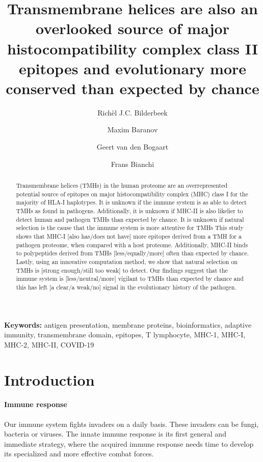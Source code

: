 \documentclass{article}
\title{
  Transmembrane helices are also 
  an overlooked source of major histocompatibility complex class II epitopes
  and evolutionary more conserved than expected by chance
}
\author[1]{Richèl J.C. Bilderbeek}
\author[1]{Maxim Baranov}
\author[1]{Geert van den Bogaart}
\author[1]{Frans Bianchi}
\affil[1]{GBB, University of 
Groningen, Groningen, The Netherlands}
\begin{document}
\maketitle

\begin{abstract}

Transmembrane helices (TMHs) in the human proteome
are an overrepresented potential source of epitopes on major 
histocompatibility complex (MHC) class I for the majority of HLA-I haplotypes. 
It is unknown if the immune system is as able to detect 
TMHs as found in pathogens.
Additionally, it is unknown if MHC-II is also likelier to detect
human and pathogen TMHs than expected by chance.
It is unknown if natural selection is the cause that 
the immune system is more attentive for TMHs
This study shows that MHC-I [also has/does not have] more
epitopes derived from a TMH for a pathogen proteome, when compared with
a host proteome.
Additionally, MHC-II binds to polypeptides derived from TMHs 
[less/equally/more] often than expected by chance.
Lastly, using an innovative computation method, 
we show that natural selection on TMHs is [strong enough/still too weak]
to detect.
Our findings suggest that the immune system is [less/neutral/more]
vigilant to TMHs than expected by chance and this has 
left [a clear/a weak/no]
signal in the evolutionary history of the pathogen.

\end{abstract}

{\bf Keywords:} antigen presentation, membrane proteins, bioinformatics, 
adaptive immunity, transmembrane domain, epitopes, T lymphocyte, 
MHC-1, MHC-I, MHC-2, MHC-II, COVID-19

\section{Introduction}

\paragraph{Immune response}

Our immune system fights invaders on a daily basis.
These invaders can be fungi, bacteria or viruses.
The innate immune response is its first general 
and immediate strategy, where the acquired immune response
needs time to develop its specialized and more effective
combat forces.
\end{document}
